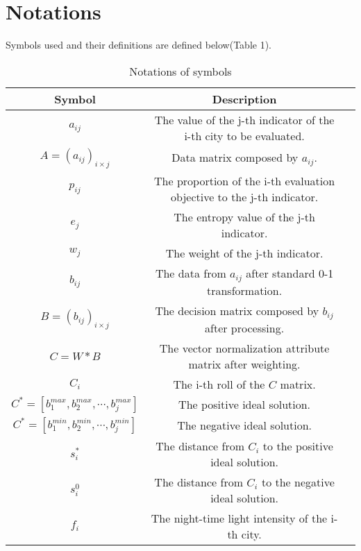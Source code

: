 \section{Notations}
Symbols used and their definitions are defined below(Table 1).
\begin{table}[h] \centering
    \caption{Notations of symbols}
    \begin{tabular}{ccl}
        \toprule
        Symbol & Description\\ \hline
        $a_{ij}$ & The value of the j-th indicator of the i-th city to be evaluated. \\
        $A=(a_{ij})_{i×j}$ & Data matrix composed by $a_{ij}$. \\
        $p_{ij}$ & The proportion of the i-th evaluation objective to the j-th indicator. \\
        $e_j$ & The entropy value of the j-th indicator. \\
        $w_j$ & The weight of the j-th indicator. \\
        $b_{ij}$ & The data from $a_{ij}$ after standard 0-1 transformation.\\
        $B=(b_{ij})_{i×j}$ & The decision matrix composed by $b_{ij}$ after processing.\\
        $C=W*B$ & The vector normalization attribute matrix after weighting. \\
        $C_i$ & The i-th roll of the $C$ matrix. \\
        $C^*=[b_1^{max},b_2^{max},\cdots,b_j^{max}]$ & The positive ideal solution. \\
        $C^*=[b_1^{min},b_2^{min},\cdots,b_j^{min}]$ & The negative ideal solution. \\
        $s_i^*$ & The distance from $C_i$ to the positive ideal solution. \\
        $s_i^0$ & The distance from $C_i$ to the negative ideal solution. \\
        $f_i$ & The night-time light intensity of the i-th city. \\
        \bottomrule
    \end{tabular}
\end{table}